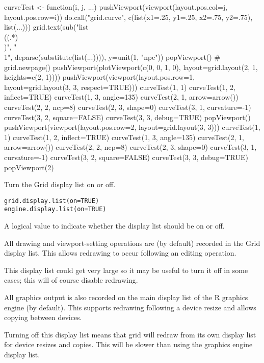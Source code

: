 \begin{Examples}
\begin{ExampleCode}
curveTest <- function(i, j, ...) {
  pushViewport(viewport(layout.pos.col=j, layout.pos.row=i))
  do.call("grid.curve", c(list(x1=.25, y1=.25, x2=.75, y2=.75), list(...)))
  grid.text(sub("list\\((.*)\\)", "\\1",
                deparse(substitute(list(...)))),
            y=unit(1, "npc"))
  popViewport()
}
# grid.newpage()
pushViewport(plotViewport(c(0, 0, 1, 0),
                          layout=grid.layout(2, 1, heights=c(2, 1))))
pushViewport(viewport(layout.pos.row=1,
                      layout=grid.layout(3, 3, respect=TRUE)))
curveTest(1, 1)
curveTest(1, 2, inflect=TRUE)
curveTest(1, 3, angle=135)
curveTest(2, 1, arrow=arrow())
curveTest(2, 2, ncp=8)
curveTest(2, 3, shape=0)
curveTest(3, 1, curvature=-1)
curveTest(3, 2, square=FALSE)
curveTest(3, 3, debug=TRUE)
popViewport()
pushViewport(viewport(layout.pos.row=2,
                      layout=grid.layout(3, 3)))
curveTest(1, 1)
curveTest(1, 2, inflect=TRUE)
curveTest(1, 3, angle=135)
curveTest(2, 1, arrow=arrow())
curveTest(2, 2, ncp=8)
curveTest(2, 3, shape=0)
curveTest(3, 1, curvature=-1)
curveTest(3, 2, square=FALSE)
curveTest(3, 3, debug=TRUE)
popViewport(2)
\end{ExampleCode}
\end{Examples}
%
\begin{Description}\relax
Turn the Grid display list on or off.
\end{Description}
%
\begin{Usage}
\begin{verbatim}
grid.display.list(on=TRUE)
engine.display.list(on=TRUE)
\end{verbatim}
\end{Usage}
%
\begin{Arguments}
\begin{ldescription}
\item[\code{on}] A logical value to indicate whether the display list
should be on or off.
\end{ldescription}
\end{Arguments}
%
\begin{Details}\relax
All drawing and viewport-setting operations are (by default)
recorded in the Grid display list.  This allows redrawing
to occur following an editing operation.

This display list could get very large so it may be useful to
turn it off in some cases;  this will of course disable redrawing.

All graphics output is also recorded on the main display list
of the R graphics engine (by default).  This supports redrawing
following a device resize and allows copying between devices.

Turning off this display list means that grid will redraw from its
own display list for device resizes and copies.  This will be slower
than using the graphics engine display list.
\end{Details}
